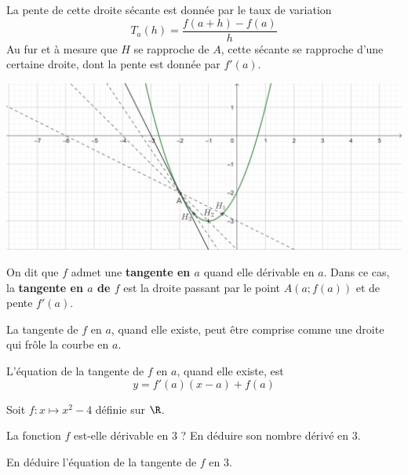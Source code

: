 \documentclass{article}
\begin{document}
\begin{remark}
La pente de cette droite sécante est donnée par le taux de variation
\begin{equation*}
T_a(h) = \dfrac{f(a + h) - f(a)}{h}
\end{equation*}
Au fur et à mesure que $H$ se rapproche de $A$, cette sécante se rapproche d'une certaine droite, dont la pente est donnée par $f'(a)$.
\begin{center}
\includegraphics[width=\textwidth]{Limite_tangente.png}
\end{center}
\end{remark}
\begin{tcolorbox}
\begin{definition}
On dit que $f$ admet une \textbf{tangente en $a$} quand elle dérivable en $a$. Dans ce cas, la \textbf{tangente en $a$ de $f$} est la droite passant par le point $A(a;f(a))$ et de pente $f'(a)$.
\end{definition}
\end{tcolorbox}
\begin{remark}
La tangente de $f$ en $a$, quand elle existe, peut être comprise comme une droite qui \og frôle \fg la courbe en $a$.
\end{remark}
\begin{proposition}
L'équation de la tangente de $f$ en $a$, quand elle existe, est
\begin{equation*}
y = f'(a)(x - a) + f(a)
\end{equation*} 
\end{proposition}
\begin{example}
Soit $f \colon x \mapsto x^2 - 4$ définie sur $\R$.
\begin{enumquestions}
\item La fonction $f$ est-elle dérivable en $3$ ? En déduire son nombre dérivé en $3$.
\item En déduire l'équation de la tangente de $f$ en $3$.
\end{enumquestions}

\emptybox{4cm}
\end{example}
\end{document}
